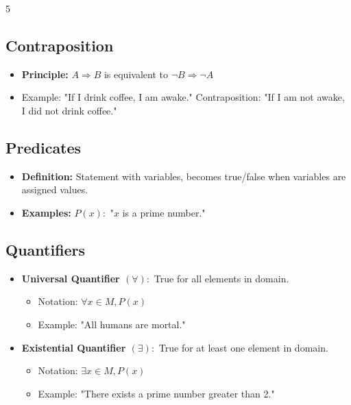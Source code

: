 \documentclass[a4paper,landscape]{article}
\begin{document}
\begin{multicols*}{5}
\subsection*{Contraposition}
\begin{itemize}[leftmargin=*, itemsep=0pt]
    \item \textbf{Principle:} $A \Rightarrow B$ is equivalent to $\neg B \Rightarrow \neg A$
    \item Example: "If I drink coffee, I am awake." Contraposition: "If I am not awake, I did not drink coffee."
\end{itemize}

\subsection*{Predicates}
\begin{itemize}[leftmargin=*, itemsep=0pt]
    \item \textbf{Definition:} Statement with variables, becomes true/false when variables are assigned values.
    \item \textbf{Examples:} $P(x):$ "$x$ is a prime number."
\end{itemize}

\subsection*{Quantifiers}
\begin{itemize}[leftmargin=*, itemsep=0pt]
    \item \textbf{Universal Quantifier $(\forall):$} True for all elements in domain.
    \begin{itemize}[leftmargin=*, itemsep=0pt]
        \item Notation: $\forall x \in M, P(x)$
        \item Example: "All humans are mortal."
    \end{itemize}
    \item \textbf{Existential Quantifier $(\exists):$} True for at least one element in domain.
    \begin{itemize}[leftmargin=*, itemsep=0pt]
        \item Notation: $\exists x \in M, P(x)$
        \item Example: "There exists a prime number greater than 2."
    \end{itemize}
\end{itemize}


\end{multicols*}
\end{document}
